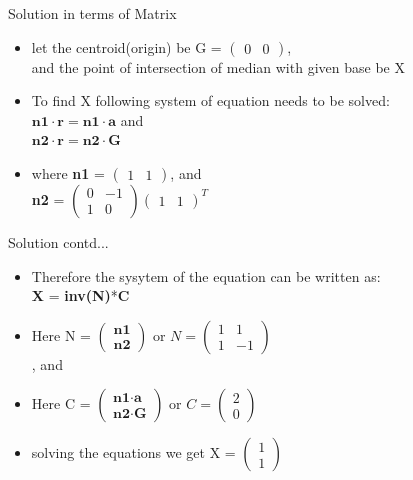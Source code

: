 \documentclass{beamer}
\begin{document}
\begin{frame}{\LARGE Solution in terms of Matrix}
\begin{itemize}
\item {let the centroid(origin) be G = $(\begin{array}{cc}0 & 0
	
	\end{array})$,\\ and the point of intersection of median with given base be X}
\item {To find X following system of equation needs to be solved:\\ 
$\textbf{n1}\cdot\textbf{r} = \textbf{n1}\cdot\textbf{a}$  and  \\ 
$\textbf{n2}\cdot\textbf{r} = \textbf{n2}\cdot\textbf{G}$}

\item {where \textbf{n1} = $(\begin{array}{cc}1 & 1\end{array})$, and \\
\textbf{n2} =  $(\begin{array}{cc}0 & -1 \\ 1 & 0
	
	\end{array})(\begin{array}{cc}1 & 1
	
	\end{array})^T
	$}
\end{itemize}

\end{frame}

\begin{frame}{Solution contd...}
\begin{itemize}
	\item {Therefore the sysytem of the equation can be written as: \\
	 \textbf{X} = \textbf{inv(N)}*\textbf{C} }
	\item {Here N = $(\begin{array}{cc}\textbf{n1}\\\textbf{n2} \end{array})$ or $N = (\begin{array}{cc}1 & 1 \\ 1 & -1\end{array})$
	\\ , and}
	\item {Here C = $(\begin{array}{cc}\textbf{n1} \cdot \textbf{a}\\\textbf{n2} \cdot \textbf{G} \end{array})$ or $C = (\begin{array}{cc}2\\0 \end{array})$}
	\item {solving the equations we get X =  $(\begin{array}{c}1\\1
	\end{array})$}

\end{itemize}
\end{frame}
\end{document}
